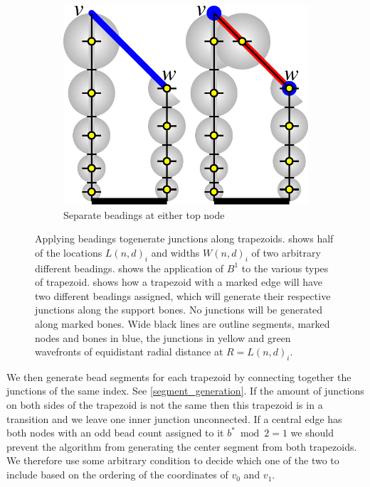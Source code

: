 \begin{figure}
\begin{subfigure}{0.5\columnwidth}
\end{subfigure}
\begin{subfigure}{0.34\columnwidth}\centering
\includegraphics[height=\figheight]{sources/method/trapezoid_beading_separate.pdf}
\caption{Separate beadings at either top node}\label{trapezoid_beading_separate}
\end{subfigure}
\caption{
Applying beadings togenerate junctions along trapezoids.
 shows half of the locations $L(n,d)_i$ and widths $W(n,d)_i$ of two arbitrary different beadings.
 shows the application of $B^1$ to the various types of trapezoid.
 shows how a trapezoid with a marked edge will have two different beadings assigned, which will generate their respective junctions along the support bones.
No junctions will be generated along marked bones.
Wide black lines are outline segments, marked nodes and bones in blue, the junctions in yellow and green wavefronts of equidistant radial distance at $R = L(n,d)_i$.
}
\label{junction_placement}
\end{figure}


We then generate bead segments for each trapezoid by connecting together the junctions of the same index.
See \cref{segment_generation}.
If the amount of junctions on both sides of the trapezoid is not the same then this trapezoid is in a transition and we leave one inner junction unconnected.
If a central edge has both nodes with an odd bead count assigned to it $b^* \bmod 2 = 1 $ we should prevent the algorithm from generating the center segment from both trapezoids.
We therefore use some arbitrary condition to decide which one of the two to include based on the ordering of the coordinates of $v_0$ and $v_1$.

